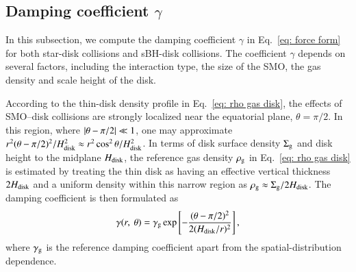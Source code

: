 \documentclass[aps,prx,reprint,superscriptaddress,nofootinbib,longbibliography]{revtex4-1}
\begin{document}
\subsection{Damping coefficient $\gamma$}\label{ref:disk coefficient}
In this subsection, we compute the damping coefficient $\gamma$ in Eq.~\eqref{eq: force form} for both star-disk collisions and sBH-disk collisions. The coefficient $\gamma$ depends on several factors, including the interaction type, the size of the SMO, the gas density and scale height of the disk.\par
According to the thin-disk density profile in Eq.~\eqref{eq: rho gas disk}, the effects of SMO–disk collisions are strongly localized near the equatorial plane, $\theta=\pi/2$. In this region, where $\abs{\theta-\pi/2}\ll 1$, one may approximate $r^2(\theta-\pi/2)^2/H_{\rm disk}^2\approx r^2\cos^2\theta/H_{\rm disk}^2$.
In terms of disk surface density $\Sigma_{\rm g}$ and disk height to the midplane $H_{\rm disk}$, the reference gas density $\rho_{\rm g}$ in Eq.~\eqref{eq: rho gas disk} is estimated by treating the thin disk as having an effective vertical thickness $2H_{\rm disk}$ and a uniform density within this narrow region as  $\rho_{\rm g}\approx \Sigma_{\rm g}/2 H_{\rm disk}$. The damping coefficient is then formulated as 
\begin{equation}
    \gamma(r,\ \theta)=\gamma_{\rm g}\exp\left[-\frac{(\theta-\pi/2)^2}{2(H_{\rm disk}/r)^2}\right],
\end{equation}
where $\gamma_{\rm g}$ is the reference damping coefficient apart from the spatial-distribution dependence.\par
\end{document}
